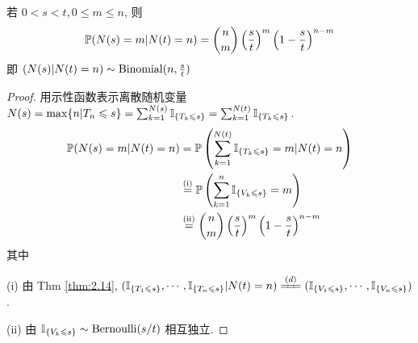 \begin{theorem}
    若 $0<s<t,0\leq m\leq n$, 则
    \begin{equation}
        \mathbb{P}(N(s)=m|N(t)=n)=\binom{n}{m}\left(\frac{s}{t}\right)^m\left(1-\frac{s}{t}\right)^{n-m}
        \label{eq:p111-4}
    \end{equation}
    即 $(N(s)|N(t)=n)\sim \operatorname{Binomial}(n,\frac{s}{t})$
\end{theorem}

\begin{proof}
    用示性函数表示离散随机变量 $N(s)=\max\{n|T_n\leqslant s\}=\sum_{k=1}^{N(s)}\mathbb I_{\{T_k\leqslant s\}}=\sum_{k=1}^{N(t)}\mathbb I_{\{T_k\leqslant s\}}$.
    \[
    \begin{aligned}
        \mathbb{P}(N(s)=m|N(t)=n) &=\mathbb{P}\left(\sum_{k=1}^{N(t)}\mathbb I_{\{T_k\leqslant s\}}=m|N(t)=n\right)\\
        &\overset{\text{(i)}}{=}\mathbb{P}\left(\sum_{k=1}^n\mathbb I_{\{V_k\leqslant s\}}=m\right)\\
        &\overset{\text{(ii)}}{=}\binom{n}{m}\left(\frac{s}{t}\right)^m\left(1-\frac{s}{t}\right)^{n-m}
    \end{aligned}
    \]
    其中 
    
    (i) 由 Thm \ref{thm:2.14}, $(\II_{\{T_1\leq s\}}, \cdots,\II_{\{T_n\leq s\}}|N(t)=n)\xlongequal{(d)}(\II_{\{V_1\leq s\}},\cdots,\II_{\{V_n\leq s\}})$. 
    
    (ii) 由 $\mathbb I_{\{V_k\leqslant s\}}\sim \operatorname{Bernoulli}(s/t)$ 相互独立.
\end{proof}
\newpage